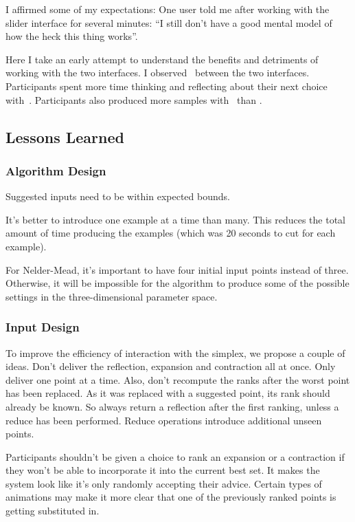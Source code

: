 I affirmed some of my expectations:
One user told me after working with the slider interface for several minutes:
``I still don't have a good mental model of how the heck this thing works''.

Here I take an early attempt to understand the benefits and detriments of working with the two interfaces.
I observed~ between the two interfaces.
Participants spent more time thinking and reflecting about their next choice with~.
Participants also produced more samples with~ than .

\subsection{Lessons Learned}

\subsubsection{Algorithm Design}

Suggested inputs need to be within expected bounds.

It's better to introduce one example at a time than many.
This reduces the total amount of time producing the examples (which was 20 seconds to cut for each example).

For Nelder-Mead, it's important to have four initial input points instead of three.
Otherwise, it will be impossible for the algorithm to produce some of the possible settings in the three-dimensional parameter space.

\subsubsection{Input Design}

To improve the efficiency of interaction with the simplex, we propose a couple of ideas.
Don't deliver the reflection, expansion and contraction all at once.
Only deliver one point at a time.
Also, don't recompute the ranks after the worst point has been replaced.
As it was replaced with a suggested point, its rank should already be known.
So always return a reflection after the first ranking, unless a reduce has been performed.
Reduce operations introduce additional unseen points.

Participants shouldn't be given a choice to rank an expansion or a contraction if they won't be able to incorporate it into the current best set.
It makes the system look like it's only randomly accepting their advice.
Certain types of animations may make it more clear that one of the previously ranked points is getting substituted in.

